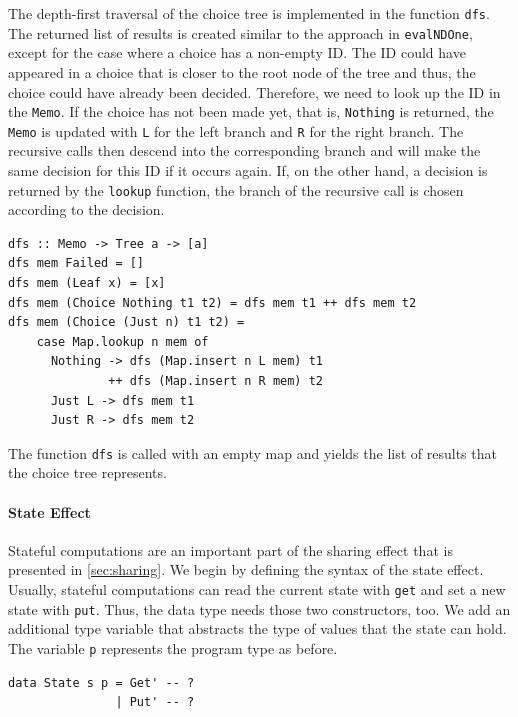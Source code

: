 \documentclass[a4paper, 11pt, fleqn, twoside]{scrreprt}
\newcommand{\todo}[1]{\marginpar{\textbf{TODO:} #1}}
\newcommand{\hinl}[1]{\texttt{#1}}
\begin{document}
The depth-first traversal of the choice tree is implemented in the function \hinl{dfs}.
The returned list of results is created similar to the approach in \hinl{evalNDOne}, except for the case where a choice has a non-empty ID.
The ID could have appeared in a choice that is closer to the root node of the tree and thus, the choice could have already been decided.
Therefore, we need to look up the ID in the \hinl{Memo}.
If the choice has not been made yet, that is, \hinl{Nothing} is returned, the \hinl{Memo} is updated with \hinl{L} for the left branch and \hinl{R} for the right branch.
The recursive calls then descend into the corresponding branch and will make the same decision for this ID if it occurs again.
If, on the other hand, a decision is returned by the \hinl{lookup} function, the branch of the recursive call is chosen according to the decision.

\begin{verbatim}
dfs :: Memo -> Tree a -> [a]
dfs mem Failed = []
dfs mem (Leaf x) = [x]
dfs mem (Choice Nothing t1 t2) = dfs mem t1 ++ dfs mem t2
dfs mem (Choice (Just n) t1 t2) =
    case Map.lookup n mem of
      Nothing -> dfs (Map.insert n L mem) t1 
              ++ dfs (Map.insert n R mem) t2
      Just L -> dfs mem t1
      Just R -> dfs mem t2
\end{verbatim}

The function \hinl{dfs} is called with an empty map and yields the list of results that the choice tree represents.
\todo{Examples}

\paragraph{State Effect}
Stateful computations are an important part of the sharing effect that is presented in \autoref{sec:sharing}.
We begin by defining the syntax of the state effect.
Usually, stateful computations can read the current state with \hinl{get} and set a new state with \hinl{put}.
Thus, the data type needs those two constructors, too.
We add an additional type variable that abstracts the type of values that the state can hold.
The variable \hinl{p} represents the program type as before.

\begin{verbatim}
data State s p = Get' -- ?
               | Put' -- ?
\end{verbatim}
\end{document}
